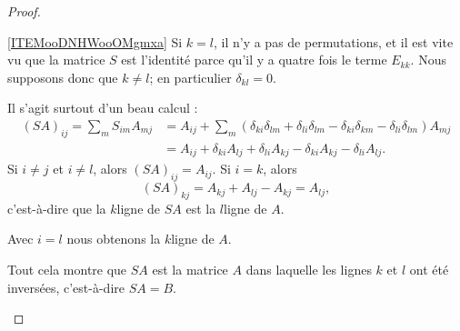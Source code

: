 \begin{proof}
\begin{subproof}
\item[\ref{ITEMooDNHWooOMgmxa}]
    Si \( k=l\), il n'y a pas de permutations, et il est vite vu que la matrice \( S\) est l'identité parce qu'il y a quatre fois le terme \( E_{kk}\). Nous supposons donc que \( k\neq l\); en particulier \( \delta_{kl}=0\).

    Il s'agit surtout d'un beau calcul :
    \begin{subequations}
        \begin{align}
            (SA)_{ij}=\sum_{m}S_{im}A_{mj}&=A_{ij}+\sum_m(\delta_{ki}\delta_{lm}+\delta_{li}\delta_{lm}-\delta_{ki}\delta_{km}-\delta_{li}\delta_{lm})A_{mj}\\
            &=A_{ij}+\delta_{ki}A_{lj}+\delta_{li}A_{kj}-\delta_{ki}A_{kj}-\delta_{li}A_{lj}.
        \end{align}
    \end{subequations}
    Si \( i\neq j\) et \( i\neq l\), alors \( (SA)_{ij}=A_{ij}\). Si \( i=k\), alors 
    \begin{equation}
        (SA)_{kj}=A_{kj}+A_{lj}-A_{kj}=A_{lj},
    \end{equation}
    c'est-à-dire que la \( k\)\ieme ligne de \( SA\) est la \( l\)\ieme ligne de \( A\).

    Avec \( i=l\) nous obtenons la \( k\)\ieme ligne de \( A\).

    Tout cela montre que \( SA\) est la matrice \( A\) dans laquelle les lignes \( k\) et \( l\) ont été inversées, c'est-à-dire \( SA=B\).


\end{subproof}
\end{proof}
